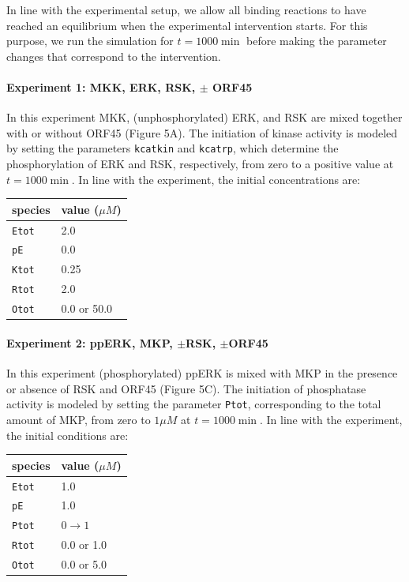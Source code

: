 \documentclass[12pt]{article}
\begin{document}
	In line with the experimental setup, we allow all binding reactions
	to have reached an equilibrium when the experimental intervention
	starts. For this purpose, we run the simulation for $t=1000\min$
	before making the parameter changes that correspond to the intervention.
	
	\paragraph{Experiment 1: MKK, ERK, RSK, $\pm$ ORF45}
	
	In this experiment MKK, (unphosphorylated) ERK, and RSK are mixed
	together with or without ORF45 (Figure 5A). The initiation of kinase
	activity is modeled by setting the parameters \texttt{kcatkin} and
	\texttt{kcatrp}, which determine the phosphorylation of ERK and RSK,
	respectively, from zero to a positive value at $t=1000\min$. In line
	with the experiment, the initial concentrations are: 
	\begin{center}
		\begin{tabular}{ll}
			species  & value ($\mu M$)\\
			\midrule 
			\texttt{Etot}  & 2.0\\
			\texttt{pE}  & 0.0 \\
			\texttt{Ktot}  & 0.25\\
			\texttt{Rtot}  & 2.0 \\
			\texttt{Otot}  & 0.0 or 50.0\\
		\end{tabular}
		\par\end{center}
	
	\paragraph{Experiment 2: ppERK, MKP, $\pm$RSK, $\pm$ORF45}
	
	In this experiment (phosphorylated) ppERK is mixed with MKP in the
	presence or absence of RSK and ORF45 (Figure 5C). The initiation of
	phosphatase activity is modeled by setting the parameter \texttt{Ptot},
	corresponding to the total amount of MKP, from zero to $1\mu M$ at
	$t=1000\min$. In line with the experiment, the initial conditions
	are: 
	\begin{center}
		\begin{tabular}{ll}
			species  & value ($\mu M$)\\
			\midrule 
			\texttt{Etot}  & 1.0\\
			\texttt{pE}  & 1.0\\
			\texttt{Ptot}  & $0\rightarrow1$\\
			\texttt{Rtot}  & 0.0 or 1.0\\
			\texttt{Otot}  & 0.0 or 5.0\\
		\end{tabular}
		\par\end{center}
	
\end{document}
